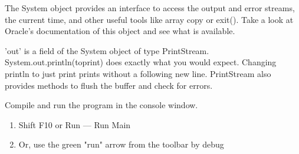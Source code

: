 \documentclass{article}
\begin{document}
\begin{steps}
   \item The System object provides an interface to access the output and error streams, the current time, and other useful tools like array copy or exit(). Take a look at Oracle's documentation of this object and see what is available.

   \item 'out' is a field of the System object of type PrintStream. System.out.println(to\textunderscore print) does exactly what you would expect. Changing println to just print prints without a following new line. PrintStream also provides methods to flush the buffer and check for errors.
   \item Compile and run the program in the console window.
   \begin{enumerate}[label=\Alph*.]
   \item Shift F10 or Run --- Run Main
   \item Or, use the green "run" arrow from the toolbar by debug
   \end{enumerate}
\end{steps}
\end{document}
